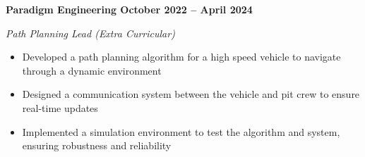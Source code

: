 \vspace{0.1cm}
\textbf{Paradigm Engineering \hfill October 2022 -- April 2024} \par
\textit{Path Planning Lead (Extra Curricular)} \par
\begin{itemize}
	\item Developed a path planning algorithm for a high speed vehicle to navigate through a dynamic environment
  \item Designed a communication system between the vehicle and pit crew to ensure real-time updates
  \item Implemented a simulation environment to test the algorithm and system, ensuring robustness and reliability
\end{itemize} \par